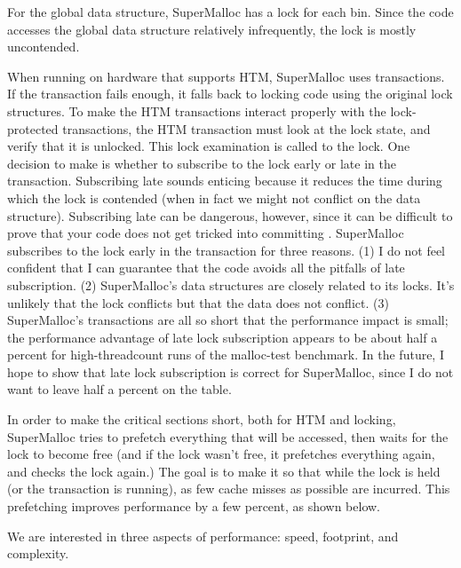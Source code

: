 \documentclass[natbib,sort&compress,10pt]{sigplanconf}
\begin{document}
For the global data structure, SuperMalloc has a lock for each bin.
Since the code accesses the global data structure relatively
infrequently, the lock is mostly uncontended.

When running on hardware that supports HTM, SuperMalloc uses transactions.  If
the transaction fails enough, it falls back to locking code using the
original lock structures.  To make the HTM transactions interact
properly with the lock-protected transactions, the HTM transaction
must look at the lock state, and verify that it is unlocked.  This
lock examination is called  to the lock.  One
decision to make is whether to subscribe to the lock early or late in
the transaction.  Subscribing late sounds enticing because it reduces
the time during which the lock is contended (when in fact we might
not conflict on the data structure).  Subscribing late can be
dangerous, however, since it can be difficult to prove that your code
does not get tricked into committing \cite{DiceHaKo14}.  SuperMalloc
subscribes to the lock early in the transaction for three reasons.
(1) I do not feel confident that I can guarantee that the code avoids
all the pitfalls of late subscription.  (2) SuperMalloc's data
structures are closely related to its locks.  It's unlikely that the
lock conflicts but that the data does not conflict.  (3) SuperMalloc's
transactions are all so short that the performance impact is small;
the performance advantage of late lock subscription appears to be
about half a percent for high-threadcount runs of the malloc-test
benchmark.  In the future, I hope to show that late lock subscription
is correct for SuperMalloc, since I do not want to leave half a
percent on the table.

In order to make the critical sections short, both for HTM and
locking, SuperMalloc tries to prefetch everything that will be
accessed, then waits for the lock to become free (and if the lock
wasn't free, it prefetches everything again, and checks the lock
again.)  The goal is to make it so that while the lock is held (or the
transaction is running), as few cache misses as possible are incurred.
This prefetching improves performance by a few percent, as shown
below.


We are interested in three aspects of performance: speed, footprint,
and complexity.
\end{document}
